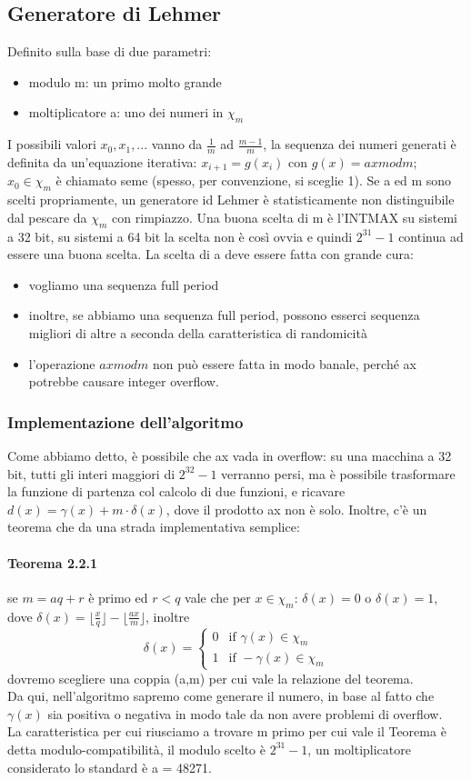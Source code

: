 \documentclass{article}
\begin{document}
\subsection{Generatore di Lehmer}
Definito sulla base di due parametri:
\begin{itemize}
\item modulo m: un primo molto grande
\item moltiplicatore a: uno dei numeri in $\chi_m$
\end{itemize}
I possibili valori $x_0, x_1,...$ vanno da $\frac{1}{m}$ ad $\frac{m-1}{m}$, la sequenza dei numeri generati è definita da un'equazione iterativa: $x_{i+1} = g(x_i)$ con $g(x) =ax mod m$; $x_0 \in \chi_m$ è chiamato seme (spesso, per convenzione, si sceglie 1). Se a ed m sono scelti propriamente, un generatore id Lehmer è statisticamente non distinguibile dal pescare da $\chi_m$ con rimpiazzo. Una buona scelta di m è l'INTMAX su sistemi a 32 bit, su sistemi a 64 bit la scelta non è così ovvia e quindi $2^{31} - 1$ continua ad essere una buona scelta. La scelta di a deve essere fatta con grande cura:
\begin{itemize}
\item vogliamo una sequenza full period
\item inoltre, se abbiamo una sequenza full period, possono esserci sequenza migliori di altre a seconda della caratteristica di randomicità
\item l'operazione $ax mod m$ non può essere fatta in modo banale, perché ax potrebbe causare integer overflow.
\end{itemize}
\subsubsection{Implementazione dell'algoritmo}
Come abbiamo detto, è possibile che ax vada in overflow: su una macchina a 32 bit, tutti gli interi maggiori di $2^{32} - 1$ verranno persi, ma è possibile trasformare la funzione di partenza col calcolo di due funzioni, e ricavare $d(x) = \gamma(x) +m\cdot \delta(x)$, dove il prodotto ax non è solo. Inoltre, c'è un teorema che da una strada implementativa semplice:
\paragraph{Teorema 2.2.1}se $m = aq + r$ è primo ed $r<q$ vale che per $x \in \chi_m$: $\delta(x) = 0$ o $\delta(x) = 1$, dove $\delta(x) = \lfloor \frac{x}{q} \rfloor - \lfloor \frac{ax}{m} \rfloor$, inoltre
\[
\delta(x) =
\begin{cases}
0 & \text{if } \gamma(x) \in \chi_m \\
1 & \text{if } - \gamma(x) \in \chi_m
\end{cases}
\]dovremo scegliere una coppia (a,m) per cui vale la relazione del teorema.\\ Da qui, nell'algoritmo sapremo come generare il numero, in base al fatto che $\gamma(x)$ sia positiva o negativa in modo tale da non avere problemi di overflow.\\ La caratteristica per cui riusciamo a trovare m primo per cui vale il Teorema è detta modulo-compatibilità, il modulo scelto è $2^{31} - 1$, un moltiplicatore considerato lo standard è a = 48271. 
\end{document}
